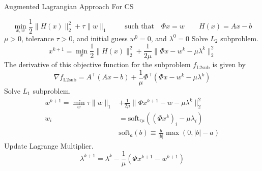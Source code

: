 \documentclass[a4paper]{article}
\begin{document}
\begin{algorithm}                      %
\caption{Augmented Lagrangian Approach For CS}%
\label{AugmentedLagrangianApproachCompressedSensing}               %
\begin{algorithmic}                    %
        \STATE
\[
  \min_{x,w} \frac{1}{2} \|H(x)\|_2^2 + \tau \| w\|_1
\qquad
\text{ such that}
\quad
\Phi x = w
\qquad
H(x) = Ax-b
\]
    \REQUIRE $\mu > 0$, tolerance $\tau > 0$, and initial guess $w^0=0$, and $\lambda^0=0$
        \STATE Solve $L_2$ subproblem. 
             \[
                x^{k+1} = \min_x \frac{1}{2} \|H(x)\|_2^2  + \frac{1}{2\mu} \|\Phi x -w^k - \mu \lambda^k \|_2^2
             \]
         The derivative of this objective function for the subproblem $f_\text{L2sub}$ is given by
             \[
             \nabla f_\text{L2sub}
             =
             A^\top 
             \left(
             A x - b
             \right)
             + 
             \frac{1}{\mu} \Phi^\top 
             \left(
             \Phi x - w^k - \mu \lambda^k
             \right)
             \]
        \STATE Solve $L_1$ subproblem. 
             \[ \begin{split}
	        w^{k+1} = \min_w \tau \|w\|_1 & + \frac{1}{2\mu} \|\Phi x^{k+1} - w - \mu \lambda^k \|_2^2
                 \\
                 w_i & = \text{soft}_{\tau \mu} \left( (\Phi x^k)_i- \mu\lambda_i \right)
                 \\
                     &  \text{soft}_a(b) \equiv \frac{b}{|b|} \max (0,|b|-a)
             \end{split}\]
        \STATE Update Lagrange Multiplier.
             \[
                \lambda^{k+1} = \lambda^k -  \frac{1}{\mu} (\Phi x^{k+1} -w^{k+1})
             \]
    \ENDWHILE
\end{algorithmic}
\end{algorithm}
\end{document}
